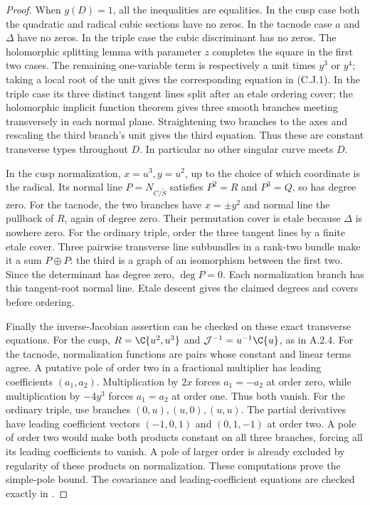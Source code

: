 \begin{proof}
When $g(D)=1$, all the inequalities are equalities. In the cusp case both the quadratic and radical cubic sections have no zeros. In the tacnode case $a$ and $\Delta$ have no zeros. In the triple case the cubic discriminant has no zeros. The holomorphic splitting lemma with parameter $z$ completes the square in the first two cases. The remaining one-variable term is respectively a unit times $y^3$ or $y^4$; taking a local root of the unit gives the corresponding equation in (C.J.1). In the triple case its three distinct tangent lines split after an etale ordering cover; the holomorphic implicit function theorem gives three smooth branches meeting transversely in each normal plane. Straightening two branches to the axes and rescaling the third branch's unit gives the third equation. Thus these are constant transverse types throughout $D$. In particular no other singular curve meets $D$.

In the cusp normalization, $x=u^3,y=u^2$, up to the choice of which coordinate is the radical. Its normal line $P=N_{C/\widetilde S}$ satisfies $P^2=R$ and $P^3=Q$, so has degree zero. For the tacnode, the two branches have $x=\pm y^2$ and normal line the pullback of $R$, again of degree zero. Their permutation cover is etale because $\Delta$ is nowhere zero. For the ordinary triple, order the three tangent lines by a finite etale cover. Three pairwise transverse line subbundles in a rank-two bundle make it a sum $P\oplus P$: the third is a graph of an isomorphism between the first two. Since the determinant has degree zero, $\deg P=0$. Each normalization branch has this tangent-root normal line. Etale descent gives the claimed degrees and covers before ordering.

Finally the inverse-Jacobian assertion can be checked on these exact transverse equations. For the cusp, $R=\C\{u^2,u^3\}$ and $\mathcal J^{-1}=u^{-1}\C\{u\}$, as in A.2.4. For the tacnode, normalization functions are pairs whose constant and linear terms agree. A putative pole of order two in a fractional multiplier has leading coefficients $(a_1,a_2)$. Multiplication by $2x$ forces $a_1=-a_2$ at order zero, while multiplication by $-4y^3$ forces $a_1=a_2$ at order one. Thus both vanish. For the ordinary triple, use branches $(0,u),(u,0),(u,u)$. The partial derivatives have leading coefficient vectors $(-1,0,1)$ and $(0,1,-1)$ at order two. A pole of order two would make both products constant on all three branches, forcing all its leading coefficients to vanish. A pole of larger order is already excluded by regularity of these products on normalization. These computations prove the simple-pole bound. The covariance and leading-coefficient equations are checked exactly in .
\end{proof}

